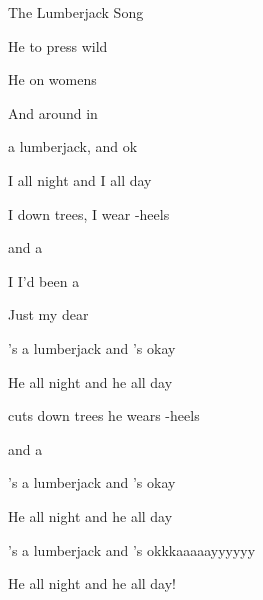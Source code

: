 \begin{SBSong}{The Lumberjack Song}
\begin{SBVerse}
    He  to press wild
    
    He  on womens 
    
    And  around in 
  \end{SBVerse}
  \begin{SBVerse}
     a lumberjack, and  ok
    
    I  all night and I  all day
    
    I  down trees, I wear -heels
    
     and a 
    
    I  I'd been a 
    
    Just  my dear 
  \end{SBVerse}
  \begin{SBVerse}
    's a lumberjack and 's okay
    
    He  all night and he  all day
    
     cuts down trees he wears -heels
    
     and a 
  \end{SBVerse}
  \begin{SBVerse}
    's a lumberjack and 's okay
    
    He  all night and he  all day
    
    's a lumberjack and 's okkkaaaaayyyyyy
    
    He  all night and he  all day!
  \end{SBVerse}
\end{SBSong}